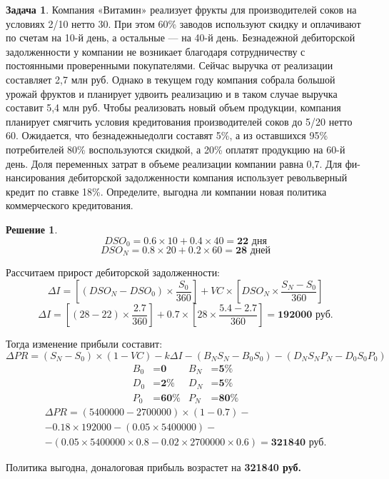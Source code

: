 \documentclass[a4paper, 14pt]{article}
\theoremstyle{plain} %
\theoremstyle{definition} %
\newtheorem*{solution}{Решение}
\newtheorem{problem}{Задача}[subsection]
\theoremstyle{remark} %
\begin{document}
\begin{problem}
	Компания  «Витамин»  реализует  фрукты  для производителей соков на условиях 2/10 нетто 30. При этом 60\% заводов используют скидку и оплачивают по счетам на 10-й день, а остальные --- на  40-й  день.  Безнадежной  дебиторской задолженности у компании не возникает благодаря сотрудничеству с постоянными проверенными покупателями. Сейчас выручка от реализации  составляет  2,7  млн  руб.  Однако  в  текущем  году компания собрала большой урожай фруктов и планирует удвоить реализацию и в таком случае выручка составит 5,4 млн руб. Чтобы реализовать  новый  объем  продукции,  компания  планирует смягчить условия кредитования производителей соков до 5/20 нетто 60.  Ожидается,  что  безнадежныедолги  составят  5\%,  а  из оставшихся 95\% потребителей 80\% воспользуются скидкой, а 20\% оплатят продукцию на 60-й день. Доля переменных затрат в объеме реализации компании равна 0,7. Для фи-нансирования дебиторской задолженности компания использует револьверный кредит по ставке  18\%.  Определите,  выгодна  ли  компании  новая  политика  коммерческого кредитования.
	\begin{solution}
		\[DSO_{0} = 0.6 \times 10 + 0.4 \times 40 = \textbf{22 дня}\]
		\[DSO_{N} = 0.8 \times 20 + 0.2 \times 60 = \textbf{28 дней}\]

		Рассчитаем прирост дебиторской задолженности:
		\[\Delta I = \left[(DSO_{N}-DSO_{0})\times \frac{S_{0}}{360}\right]+VC\times \left[DSO_{N}\times \frac{S_{N}-S_{0}}{360}\right]\]
		\[\Delta I = \left[(28-22)\times \frac{2.7}{360}\right]+0.7\times \left[28\times \frac{5.4-2.7}{360}\right] = \textbf{192000 руб.}\]

		Тогда изменение прибыли составит:
		\[\Delta PR = (S_{N} - S_{0})\times(1-VC) - k\Delta I - (B_{N}S_{N} - B_{0}S_{0}) - (D_{N}S_{N}P_{N} - D_{0}S_{0}P_{0})\]
		\begin{align*}
			B_{0} &= \textbf{0} & B_{N} &= \textbf{5\%} \\
			D_{0} &= \textbf{2\%} & D_{N} &= \textbf{5\%} \\
			P_{0} &= \textbf{60\%} & P_{N} &= \textbf{80\%}
		\end{align*}
		\begin{multline*}
			\Delta PR = (5400000 - 2700000)\times(1-0.7) - \\ - 0.18\times 192000 - (0.05 \times 5400000) - \\
			- (0.05 \times 5400000 \times 0.8 - 0.02 \times 2700000 \times 0.6) = \textbf{321840 руб.}
		\end{multline*}

		Политика выгодна, доналоговая прибыль возрастет на \textbf{321840 руб.}
	\end{solution}
\end{problem}
\end{document}
